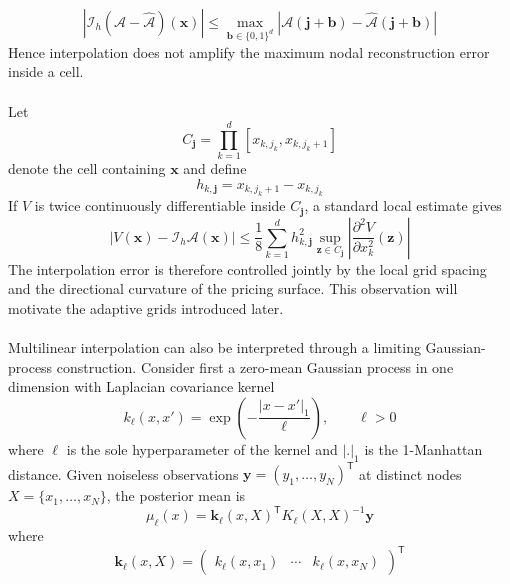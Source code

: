 \documentclass{article}
\numberwithin{equation}{subsection}
\theoremstyle{definition}
\theoremstyle{remark}
\begin{document}
\begin{equation}
\left|
\mathcal{I}_h
\left(
\mathcal{A}-\widehat{\mathcal{A}}
\right)(\boldsymbol{x})
\right|
\leq
\max_{\boldsymbol{b}\in\{0,1\}^d}
\left|
\mathcal{A}(\boldsymbol{j}+\boldsymbol{b})
-
\widehat{\mathcal{A}}(\boldsymbol{j}+\boldsymbol{b})
\right|
\end{equation}
Hence interpolation does not amplify the maximum nodal reconstruction error
inside a cell.\\
\\
Let
\begin{equation}
C_{\boldsymbol{j}} = \prod_{k=1}^{d} [x_{k,j_k},x_{k,j_k+1}]
\end{equation}
denote the cell containing $\boldsymbol{x}$ and define
\begin{equation}
h_{k,\boldsymbol{j}} = x_{k,j_k+1}-x_{k,j_k}
\end{equation}
If $V$ is twice continuously differentiable inside $C_{\boldsymbol{j}}$, a
standard local estimate gives
\[
\left|
V(\boldsymbol{x})
-
\mathcal{I}_h\mathcal{A}(\boldsymbol{x})
\right|
\leq
\frac{1}{8}
\sum_{k=1}^{d}
h_{k,\boldsymbol{j}}^2
\sup_{\boldsymbol{z}\in C_{\boldsymbol{j}}}
\left|
\frac{\partial^2 V}
{\partial x_k^2}(\boldsymbol{z})
\right|
\]
The interpolation error is therefore controlled jointly by the local grid
spacing and the directional curvature of the pricing surface. This observation
will motivate the adaptive grids introduced later.\\
\\
Multilinear interpolation can also be interpreted through a limiting
Gaussian-process construction. Consider first a zero-mean Gaussian process in
one dimension with Laplacian covariance kernel
\begin{equation}
k_{\ell}(x,x')
=
\exp\!\left(
-\frac{|x-x'|_1}{\ell}
\right),
\qquad
\ell>0
\end{equation}
where $\ell$ is the sole hyperparameter of the kernel and $|.|_1$ is the 1-Manhattan distance. 
Given noiseless observations
\(\boldsymbol{y}=(y_1,\ldots,y_N)^{\mathsf T}\) at distinct nodes
\(X=\{x_1,\ldots,x_N\}\), the posterior mean is
\begin{equation}
\mu_{\ell}(x)
=
\boldsymbol{k}_{\ell}(x,X)^{\mathsf T}
K_{\ell}(X,X)^{-1}
\boldsymbol{y}
\end{equation}
where
\begin{equation}
\boldsymbol{k}_{\ell}(x,X)
=
\begin{pmatrix}
k_{\ell}(x,x_1) &
\cdots &
k_{\ell}(x,x_N)
\end{pmatrix}^{\mathsf T}
\end{equation}
\end{document}
